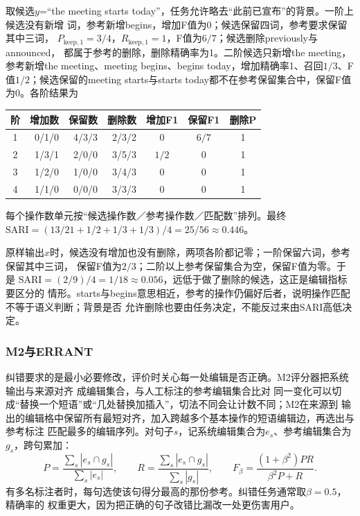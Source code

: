 取候选$y$=“the meeting starts today”，任务允许略去“此前已宣布”的背景。一阶上候选没有新增
词，参考新增begins，增加F值为0；候选保留四词，参考要求保留其中三词，
$P_{\mathrm{keep},1}=3/4$，$R_{\mathrm{keep},1}=1$，F值为$6/7$；候选删除previously与announced，
都属于参考的删除，删除精确率为1。二阶候选只新增the meeting，参考新增the meeting、meeting
begins、begins today，增加精确率1、召回$1/3$、F值$1/2$；候选保留的meeting starts与starts
today都不在参考保留集合中，保留F值为0。各阶结果为
\begin{center}
  \small
  \begin{tabular}{@{}crrrccc@{}}
    \toprule
    阶 & 增加数 & 保留数 & 删除数 & 增加F1 & 保留F1 & 删除P\\
    \midrule
    1 & 0/1/0 & 4/3/3 & 2/3/2 & 0 & $6/7$ & 1\\
    2 & 1/3/1 & 2/0/0 & 3/5/3 & $1/2$ & 0 & 1\\
    3 & 1/2/0 & 1/0/0 & 3/4/3 & 0 & 0 & 1\\
    4 & 1/1/0 & 0/0/0 & 3/3/3 & 0 & 0 & 1\\
    \bottomrule
  \end{tabular}
\end{center}
每个操作数单元按“候选操作数／参考操作数／匹配数”排列。最终
$\mathrm{SARI}=(13/21+1/2+1/3+1/3)/4=25/56\approx0.446$。

原样输出$x$时，候选没有增加也没有删除，两项各阶都记零；一阶保留六词，参考保留其中三词，
保留F值为$2/3$；二阶以上参考保留集合为空，保留F值为零。于是
$\mathrm{SARI}=(2/9)/4=1/18\approx0.056$，远低于做了删除的候选，这正是编辑指标要区分的
情形。starts与begins意思相近，参考的操作仍偏好后者，说明操作匹配不等于语义判断；背景是否
允许删除也要由任务决定，不能反过来由SARI高低决定。

\subsubsection{M2与ERRANT}
\label{sec:nlp-generation-m2-errant}

纠错要求的是最小必要修改，评价时关心每一处编辑是否正确。M2评分器把系统输出与来源对齐
成编辑集合，与人工标注的参考编辑集合比对
同一变化可以切成“替换一个短语”或“几处替换加插入”，切法不同会让计数不同；M2在来源到
输出的编辑格中保留所有最短对齐，加入跨越多个基本操作的短语编辑边，再选出与参考标注
匹配最多的编辑序列。对句子$s$，记系统编辑集合为$e_s$、参考编辑集合为$g_s$，跨句累加：
\begin{equation}
  P=\frac{\sum_s|e_s\cap g_s|}{\sum_s|e_s|},\qquad
  R=\frac{\sum_s|e_s\cap g_s|}{\sum_s|g_s|},\qquad
  F_\beta=\frac{(1+\beta^2)PR}{\beta^2P+R}.
  \label{eq:nlp-generation-m2}
\end{equation}
有多名标注者时，每句选使该句得分最高的那份参考。纠错任务通常取$\beta=0.5$，精确率的
权重更大，因为把正确的句子改错比漏改一处更伤害用户。

